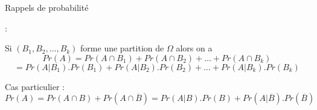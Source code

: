\documentclass{beamer}
\begin{document}
\begin{frame}{Rappels de probabilité}

 :


\begin{center}
\end{center}


Si $(B_1, B_2, \hdots, B_k)$ forme une partition de $\Omega$  alors on a
$$
Pr(A)=Pr(A \cap B_1) + Pr(A \cap B_2) + \hdots + Pr(A \cap B_k) 
$$
$$
=Pr(A|B_1).Pr(B_1)+ Pr(A|B_2).Pr(B_2) + \hdots + Pr(A|B_k).Pr(B_k)
$$

\noindent Cas particulier : 
${\displaystyle Pr(A)=  Pr(A \cap B)+Pr(A \cap \overline{B})
=  Pr(A|B).Pr(B)+Pr(A| \overline{B}). Pr(\overline{B})}$
\end{frame}
\end{document}
